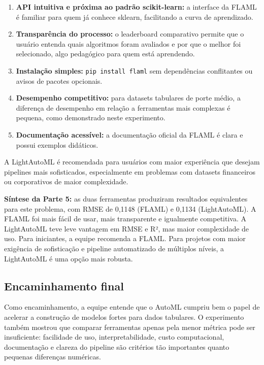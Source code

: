 \documentclass[11pt, a4paper, oneside]{article}
\begin{document}
\begin{enumerate}[leftmargin=1.5cm, itemsep=4pt]
  \item \textbf{API intuitiva e próxima ao padrão scikit-learn:} a interface da FLAML é familiar para quem já conhece sklearn, facilitando a curva de aprendizado.
  \item \textbf{Transparência do processo:} o leaderboard comparativo permite que o usuário entenda quais algoritmos foram avaliados e por que o melhor foi selecionado, algo pedagógico para quem está aprendendo.
  \item \textbf{Instalação simples:} \texttt{pip install flaml} sem dependências conflitantes ou avisos de pacotes opcionais.
  \item \textbf{Desempenho competitivo:} para datasets tabulares de porte médio, a diferença de desempenho em relação a ferramentas mais complexas é pequena, como demonstrado neste experimento.
  \item \textbf{Documentação acessível:} a documentação oficial da FLAML é clara e possui exemplos didáticos.
\end{enumerate}

A LightAutoML é recomendada para usuários com maior experiência que desejam pipelines
mais sofisticados, especialmente em problemas com datasets financeiros ou corporativos
de maior complexidade.

\begin{infobox}
\textbf{Síntese da Parte 5:} as duas ferramentas produziram resultados equivalentes
para este problema, com RMSE de 0,1148 (FLAML) e 0,1134 (LightAutoML). A FLAML foi
mais fácil de usar, mais transparente e igualmente competitiva. A LightAutoML teve
leve vantagem em RMSE e R², mas maior complexidade de uso. Para iniciantes, a equipe
recomenda a FLAML. Para projetos com maior exigência de sofisticação e pipeline
automatizado de múltiplos níveis, a LightAutoML é uma opção mais robusta.
\end{infobox}

\subsection{Encaminhamento final}
\label{sec:encaminhamento-final}

Como encaminhamento, a equipe entende que o AutoML cumpriu bem o papel de acelerar a
construção de modelos fortes para dados tabulares. O experimento também mostrou que
comparar ferramentas apenas pela menor métrica pode ser insuficiente: facilidade de
uso, interpretabilidade, custo computacional, documentação e clareza do pipeline são
critérios tão importantes quanto pequenas diferenças numéricas.
\end{document}
